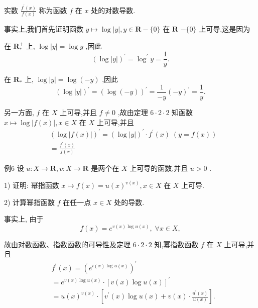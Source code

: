 实数 $\frac{{f}^{\prime }\left( x\right) }{f\left( x\right) }$ 称为函数 $f$ 在 $x$ 处的对数导数.

事实上,我们首先证明函数 $y \mapsto  \log \left| y\right| ,y \in  \mathbf{R} - \{ 0\}$ 在 $\mathbf{R}$  $- \{ 0\}$ 上可导,这是因为

在 ${\mathbf{R}}_{ * }^{ + }$ 上, $\log \left| y\right|  = \log y$ ,因此
$${\left( \log \left| y\right| \right) }^{\prime } = {\log }^{\prime }y = \frac{1}{y}.$$

在 ${\mathbf{R}}_{ * }$ 上, $\log \left| y\right|  = \log \left( {-y}\right)$ ,因此
$${\left( \log \left| y\right| \right) }^{\prime } = {\left( \log \left( -y\right) \right) }^{\prime } = \frac{1}{-y}{\left( -y\right) }^{\prime } = \frac{1}{y}.$$

另一方面, $f$ 在 $X$ 上可导,并且 $f \neq  0$ ,故由定理 $6 \cdot  2 \cdot  2$ 知函数 $x \mapsto  \log \left| {f\left( x\right) }\right| ,x \in  X$ 在 $X$ 上可导,并且
\begin{align*}
	&{\left( \log \left| f\left( x\right) \right| \right) }^{\prime } = {\left( \log \left| y\right| \right) }^{\prime } \cdot  {f}^{\prime }\left( x\right) \;\left( {y = f\left( x\right) }\right)\\
	&= \frac{{f}^{\prime }\left( x\right) }{f\left( x\right) }
\end{align*}

例6 设 $u : X \rightarrow  \mathbf{R},v : X \rightarrow  \mathbf{R}$ 是两个在 $X$ 上可导的函数,并且 $u > 0$ .

1) 证明: 幂指函数 $x \mapsto  f\left( x\right)  = u{\left( x\right) }^{v\left( x\right) },x \in  X$ 在 $X$ 上可导.

2) 计算幂指函数 $f$ 在任一点 $x \in  X$ 处的导数.

事实上, 由于
$$f\left( x\right)  = {e}^{v\left( x\right) \log u\left( x\right) },\;\forall x \in  X,$$

故由对数函数、指数函数的可导性及定理 $6 \cdot  2 \cdot  2$ 知,幂指数函数 $f$ 在 $X$ 上可导,并且
\begin{align*}
	&{f}^{\prime }\left( x\right)  = {\left( {e}^{i\left( x\right) \log u\left( x\right) }\right) }^{\prime }\\
	&= {e}^{v\left( x\right) \log u\left( x\right) } \cdot  {\left\lbrack  v\left( x\right) \log u\left( x\right) \right\rbrack  }^{\prime }\\
	&= u{\left( x\right) }^{v\left( x\right) } \cdot  \left\lbrack  {{v}^{\prime }\left( x\right) \log u\left( x\right)  + v\left( x\right)  \cdot  \frac{{u}^{\prime }\left( x\right) }{u\left( x\right) }}\right\rbrack  .
\end{align*}

